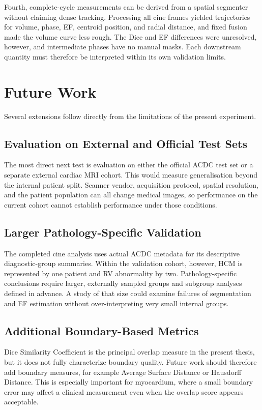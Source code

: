 Fourth, complete-cycle measurements can be derived from a spatial segmenter without claiming dense tracking. Processing all cine frames yielded trajectories for volume, phase, EF, centroid position, and radial distance, and fixed fusion made the volume curve less rough. The Dice and EF differences were unresolved, however, and intermediate phases have no manual masks. Each downstream quantity must therefore be interpreted within its own validation limits.

\section{Future Work}
Several extensions follow directly from the limitations of the present experiment.

\subsection{Evaluation on External and Official Test Sets}
The most direct next test is evaluation on either the official ACDC test set or a separate external cardiac MRI cohort. This would measure generalisation beyond the internal patient split. Scanner vendor, acquisition protocol, spatial resolution, and the patient population can all change medical images, so performance on the current cohort cannot establish performance under those conditions.

\subsection{Larger Pathology-Specific Validation}
The completed cine analysis uses actual ACDC metadata for its descriptive diagnostic-group summaries. Within the validation cohort, however, HCM is represented by one patient and RV abnormality by two. Pathology-specific conclusions require larger, externally sampled groups and subgroup analyses defined in advance. A study of that size could examine failures of segmentation and EF estimation without over-interpreting very small internal groups.

\subsection{Additional Boundary-Based Metrics}
Dice Similarity Coefficient is the principal overlap measure in the present thesis, but it does not fully characterize boundary quality. Future work should therefore add boundary measures, for example Average Surface Distance or Hausdorff Distance. This is especially important for myocardium, where a small boundary error may affect a clinical measurement even when the overlap score appears acceptable.

